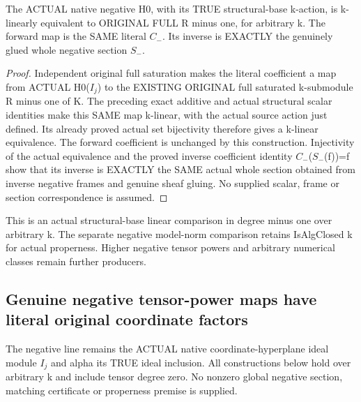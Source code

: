 \begin{theorem}
\label{thm:seven-native-negative-actual-linear-full-h0}
\leanok
The ACTUAL native negative H0, with its TRUE structural-base k-action,
is k-linearly equivalent to ORIGINAL FULL R minus one, for arbitrary k.
The forward map is the SAME literal $C_-$. Its inverse is EXACTLY the
genuinely glued whole negative section $S_-$.
\end{theorem}
\begin{proof}
Independent original full saturation makes the literal coefficient a
map from ACTUAL H0($I_j$) to the EXISTING ORIGINAL full saturated
k-submodule R minus one of K. The preceding exact additive and actual
structural scalar identities make this SAME map k-linear, with the
actual source action just defined. Its already proved actual set
bijectivity therefore gives a k-linear equivalence. The forward
coefficient is unchanged by this construction. Injectivity of the
actual equivalence and the proved inverse coefficient identity
$C_-$($S_-$(f))=f show that its inverse is EXACTLY the SAME actual whole
section obtained from inverse negative frames and genuine sheaf gluing.
No supplied scalar, frame or section correspondence is assumed.
\end{proof}

This is an actual structural-base linear comparison in degree minus
one over arbitrary k. The separate negative model-norm comparison
retains IsAlgClosed k for actual properness. Higher negative tensor
powers and arbitrary numerical classes remain further producers.

\subsection{Genuine negative tensor-power maps have literal original coordinate factors}
The negative line remains the ACTUAL native coordinate-hyperplane ideal
module $I_j$ and alpha its TRUE ideal inclusion. All constructions below
hold over arbitrary k and include tensor degree zero. No nonzero global
negative section, matching certificate or properness premise is supplied.

